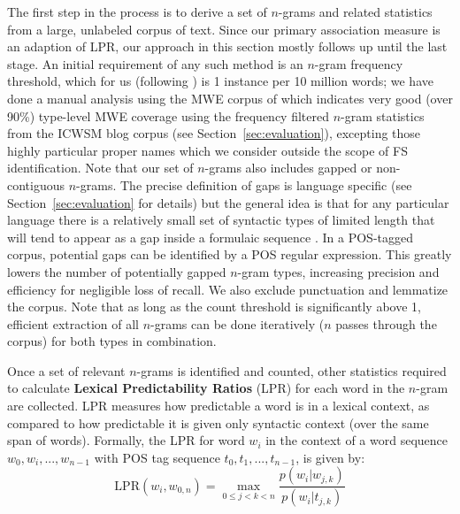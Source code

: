\documentclass[11pt,letterpaper]{article}
\newcommand{\termdef}[1]{\textbf{#1}\xspace}
\newcommand{\LPR}{\ensuremath{\text{LPR}}}
\newcommand{\secref}[2][]{Section#1~\ref{#2}\xspace}
\begin{document}
The first step in the process is to derive a set of $n$-grams and related statistics from a large, unlabeled corpus of text. Since our primary association measure is an adaption of LPR, our approach in this section mostly follows  up until the last stage. An initial requirement of any such method is an $n$-gram frequency threshold, which for us (following ) is 1 instance per 10 million words; we have done a manual analysis using the MWE corpus of  which indicates very good (over 90\%) type-level MWE coverage using the frequency filtered $n$-gram statistics from the ICWSM blog corpus (see \secref{sec:evaluation}), excepting those highly particular proper names which we consider outside the scope of FS identification. 
Note that our set of $n$-grams also includes gapped or non-contiguous $n$-grams. The precise definition of gaps is language specific (see \secref{sec:evaluation} for details) but the general idea is that for any particular language there is a relatively small set of syntactic types of limited length that will tend to appear as a gap inside a formulaic sequence \cite{Wasow:2002}.
 In a POS-tagged corpus, potential gaps can be identified by a POS regular expression. This greatly lowers the number of potentially gapped $n$-gram types, increasing precision and efficiency for negligible loss of recall. We also exclude punctuation and lemmatize the corpus.  Note that as long as the count threshold is significantly above 1, efficient extraction of all $n$-grams can be done iteratively ($n$ passes through the corpus) for both types in combination. 

Once a set of relevant $n$-grams is identified and counted, other statistics required to calculate \termdef{Lexical Predictability Ratios} (LPR) for each word in the $n$-gram are collected. LPR measures how predictable a word is in a lexical context, as compared to how predictable it is given only syntactic context (over the same span of words). Formally, the LPR for word $w_i$ in the context of a word sequence $w_0, w_i, ..., w_{n-1}$ with POS tag sequence $t_0, t_1, ..., t_{n-1}$, is given by:
\begin{displaymath}
\LPR(w_i,w_{0,n}) = \max_{0 \leq j < k < n }{\frac{p(w_i|w_{j,k})}{p(w_i|t_{j,k})}}
\end{displaymath}
\end{document}
